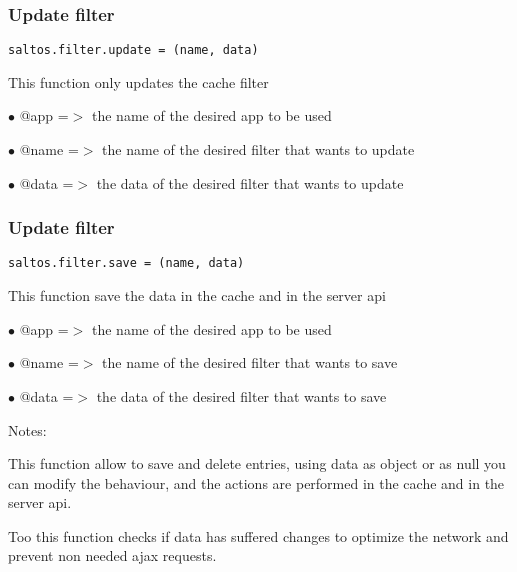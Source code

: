 \documentclass[a4paper]{article}
\begin{document}
\hypertarget{toc769}{}
\subsubsection{Update filter}

\begin{lstlisting}
saltos.filter.update = (name, data)
\end{lstlisting}

This function only updates the cache filter

\begin{compactitem}
\item[\color{myblue}$\bullet$] @app  =$>$ the name of the desired app to be used
\item[\color{myblue}$\bullet$] @name =$>$ the name of the desired filter that wants to update
\item[\color{myblue}$\bullet$] @data =$>$ the data of the desired filter that wants to update
\end{compactitem}

\hypertarget{toc770}{}
\subsubsection{Update filter}

\begin{lstlisting}
saltos.filter.save = (name, data)
\end{lstlisting}

This function save the data in the cache and in the server api

\begin{compactitem}
\item[\color{myblue}$\bullet$] @app  =$>$ the name of the desired app to be used
\item[\color{myblue}$\bullet$] @name =$>$ the name of the desired filter that wants to save
\item[\color{myblue}$\bullet$] @data =$>$ the data of the desired filter that wants to save
\end{compactitem}

Notes:

This function allow to save and delete entries, using data as object or as null
you can modify the behaviour, and the actions are performed in the cache and
in the server api.

Too this function checks if data has suffered changes to optimize the network
and prevent non needed ajax requests.

\hypertarget{toc771}{}
\end{document}
